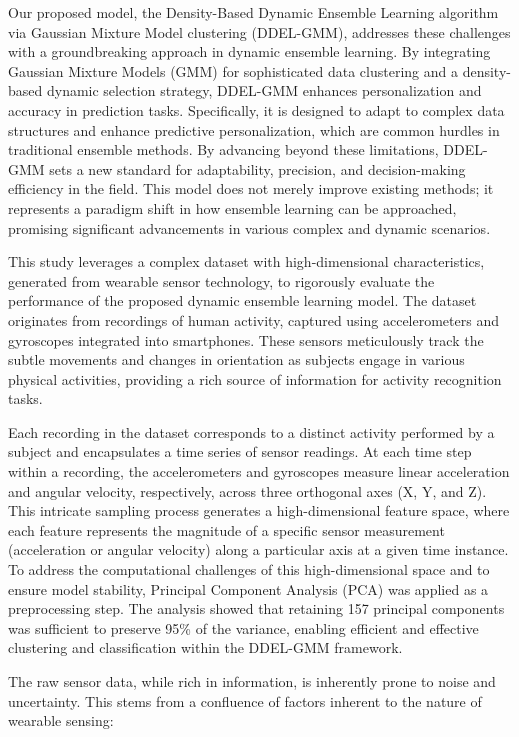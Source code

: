 \documentclass[lettersize,journal]{IEEEtran}
\begin{document}
	Our proposed model, the Density-Based Dynamic Ensemble Learning algorithm via Gaussian Mixture Model clustering (DDEL-GMM), addresses these challenges with a groundbreaking approach in dynamic ensemble learning. By integrating Gaussian Mixture Models (GMM) for sophisticated data clustering and a density-based dynamic selection strategy, DDEL-GMM enhances personalization and accuracy in prediction tasks. Specifically, it is designed to adapt to complex data structures and enhance predictive personalization, which are common hurdles in traditional ensemble methods. By advancing beyond these limitations, DDEL-GMM sets a new standard for adaptability, precision, and decision-making efficiency in the field. This model does not merely improve existing methods; it represents a paradigm shift in how ensemble learning can be approached, promising significant advancements in various complex and dynamic scenarios.
	
	This study leverages a complex dataset with high-dimensional characteristics, generated from wearable sensor technology, to rigorously evaluate the performance of the proposed dynamic ensemble learning model. The dataset originates from recordings of human activity, captured using accelerometers and gyroscopes integrated into smartphones. These sensors meticulously track the subtle movements and changes in orientation as subjects engage in various physical activities, providing a rich source of information for activity recognition tasks.
	
	Each recording in the dataset corresponds to a distinct activity performed by a subject and encapsulates a time series of sensor readings. At each time step within a recording, the accelerometers and gyroscopes measure linear acceleration and angular velocity, respectively, across three orthogonal axes (X, Y, and Z). This intricate sampling process generates a high-dimensional feature space, where each feature represents the magnitude of a specific sensor measurement (acceleration or angular velocity) along a particular axis at a given time instance. To address the computational challenges of this high-dimensional space and to ensure model stability, Principal Component Analysis (PCA) was applied as a preprocessing step. The analysis showed that retaining 157 principal components was sufficient to preserve 95\% of the variance, enabling efficient and effective clustering and classification within the DDEL-GMM framework.
	
	The raw sensor data, while rich in information, is inherently prone to noise and uncertainty. This stems from a confluence of factors inherent to the nature of wearable sensing: 
	
\end{document}
